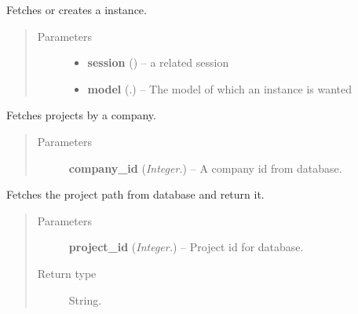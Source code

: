 \documentclass[letterpaper,10pt,english]{sphinxmanual}
\begin{document}
\begin{fulllineitems}
\label{api:controller.GetOrCreate}
Fetches or creates a instance.
\begin{quote}\begin{description}
\item[{Parameters}] \leavevmode\begin{itemize}
\item {} 
\textbf{session} ({\hyperref[api:models.Session]{}}) -- a related session

\item {} 
\textbf{model} (.) -- The model of which an instance is wanted

\end{itemize}

\end{description}\end{quote}

\end{fulllineitems}


\begin{fulllineitems}
\label{api:controller.GetProject}
Fetches projects by a company.
\begin{quote}\begin{description}
\item[{Parameters}] \leavevmode
\textbf{company\_id} (\emph{Integer.}) -- A company id from database.

\end{description}\end{quote}

\end{fulllineitems}


\begin{fulllineitems}
\label{api:controller.GetProjectPath}
Fetches the project path from database and return it.
\begin{quote}\begin{description}
\item[{Parameters}] \leavevmode
\textbf{project\_id} (\emph{Integer.}) -- Project id for database.

\item[{Return type}] \leavevmode
String.

\end{description}\end{quote}

\end{fulllineitems}
\end{document}
